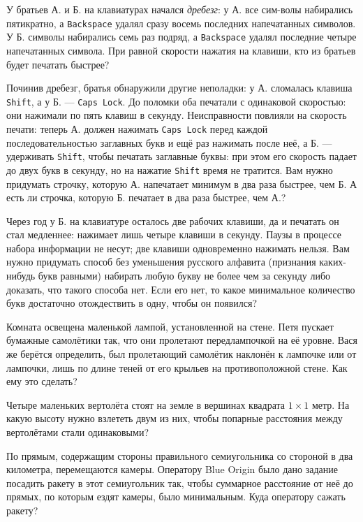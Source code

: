 \begin{itemize}
\itA У братьев А. и Б. на клавиатурах начался {\itshape дребезг}: у А. все сим-\linebreak волы набирались пятикратно, а {\verb!Backspace!} удалял сразу восемь последних напечатанных символов. У Б. символы набирались семь раз подряд, а {\verb!Backspace!} удалял последние четыре напечатанных символа. При равной скорости нажатия на клавиши, кто из братьев будет печатать быстрее?

\itB Починив дребезг, братья обнаружили другие неполадки: у А. сломалась клавиша {\verb!Shift!}, а у Б. — {\verb!Caps Lock!}. До поломки оба печатали с одинаковой скоростью: они нажимали по пять клавиш в секунду. Неисправности повлияли на скорость печати: теперь А. должен нажимать {\verb!Caps Lock!} перед каждой последовательностью заглавных букв и ещё раз нажимать после неё, а Б. — удерживать {\verb!Shift!}, чтобы печатать заглавные буквы: при этом его скорость падает до двух букв в секунду, но на нажатие {\verb!Shift!} время не тратится. Вам нужно придумать строчку, которую А. напечатает минимум в два раза быстрее, чем Б. А есть ли строчка, которую Б. печатает в два раза быстрее, чем А.?

\itC Через год у Б. на клавиатуре осталось две рабочих клавиши, да и печатать он стал медленнее: нажимает лишь четыре клавиши в секунду. Паузы в процессе набора информации не несут; две клавиши одновременно нажимать нельзя. Вам нужно придумать способ без уменьшения русского алфавита (признания каких-нибудь букв равными) набирать любую букву не более чем за секунду либо доказать, что такого способа нет. Если его нет, то какое минимальное количество букв достаточно отождествить в одну, чтобы он появился?
\end{itemize}

\begin{itemize}
\itA Комната освещена маленькой лампой, установленной на стене. Петя пускает бумажные самолётики так, что они пролетают перед\linebreak лампочкой на её уровне. Вася же берётся определить, был пролетающий самолётик наклонён к лампочке или от лампочки, лишь по длине теней от его крыльев на противоположной стене. Как ему это сделать?

\itB Четыре маленьких вертолёта стоят на земле в вершинах квадрата $1 \times 1$ метр. На какую высоту нужно взлететь двум из них, чтобы попарные расстояния между вертолётами стали одинаковыми?

\itC По прямым, содержащим стороны правильного семиугольника со стороной в два километра, перемещаются камеры. Оператору Blue Origin было дано задание посадить ракету в этот семиугольник так, чтобы суммарное расстояние от неё до прямых, по которым ездят камеры, было минимальным. Куда оператору сажать ракету?
\end{itemize}

